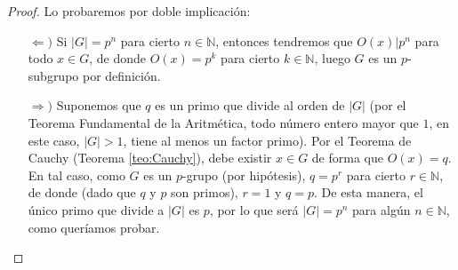 \documentclass[12pt]{article}
\newcommand{\N}{\mathbb{N}}
\begin{document}
\begin{ejercicio}[2 puntos]
        \begin{proof}
            Lo probaremos por doble implicación:
            \begin{itemize}
                \item[$\Longleftarrow)$] Si $|G|=p^n$ para cierto $n \in \N$, entonces tendremos que $O(x) | p^n$ para todo $x \in G$, de donde $O(x) = p^{k}$ para cierto $k \in \N$, luego $G$ es un $p$-subgrupo por definición. 
                \item[$\Longrightarrow)$] Suponemos que $q$ es un primo que divide al orden de $|G|$ (por el Teorema Fundamental de la Aritmética, todo número entero mayor que $1$, en este caso, $|G|>1$, tiene al menos un factor primo). Por el Teorema de Cauchy (Teorema \ref{teo:Cauchy}), debe existir $x \in G$ de forma que $O(x) = q$. En tal caso, como $G$ es un $p$-grupo (por hipótesis), $q=p^{r}$ para cierto $r \in \N$, de donde (dado que $q$ y $p$ son primos), $r = 1$ y $q = p$. De esta manera, el único primo que divide a $|G|$ es $p$, por lo que será $|G| = p^{n}$ para algún $n \in \N$, como queríamos probar.
                \end{itemize}
        \end{proof}
    \end{ejercicio}
\end{document}
